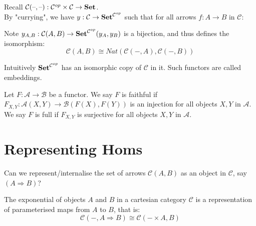 \begin{definition}
Recall $\mathcal{C}(\text{--}, \text{--}): \mathcal{C}^{op} \times \mathcal{C}
 \rightarrow \mathbf {Set}$.\\
By "currying", we have $y: \mathcal{C} \rightarrow \mathbf {Set}^{\mathcal{C}^{op}}$
 such that for all arrows $f: A \rightarrow B$ in $\mathcal{C}$:
\begin{center}
\end{center}

Note $y_{A,B} : \mathcal{C}(A,B) \rightarrow \mathbf {Set}^{\mathcal{C}^{op}}(y_A, y_B)$ 
is a bijection, and thus defines the isomorphism:
\[ \mathcal{C}(A,B)  \cong  Nat( \mathcal{C}(-,A), \mathcal{C}(-,B)) \]

Intuitively $\mathbf {Set}^{\mathcal{C}^{op}}$ has an isomorphic copy of 
$\mathcal{C}$ in it. Such functors are called embeddings.
\end{definition}


\begin{definition}
Let $F : \mathcal{A} \rightarrow \mathcal{B}$ be a functor. We say $F$ is 
faithful if $F_{X,Y} : \mathcal{A}(X,Y) \rightarrow \mathcal{B}(F(X),F(Y))$ 
is an injection for all objects $X,Y$ in $\mathcal{A}$. We say $F$ is full 
if $F_{X,Y}$ is surjective for all objects $X,Y$ in $\mathcal{A}$.
\end{definition}


\section{Representing Homs}

Can we represent/internalise the set of arrows $\mathcal{C}(A,B)$ as an object in 
$\mathcal{C}$, say $(A \Rightarrow B)$?

\begin{definition}[Exponentials]
The exponential of objects $A$ and $B$ in a cartesian category $\mathcal{C}$ 
is a representation of parameterised maps from $A$ to $B$, that is:
\[  \mathcal{C}(-, A \Rightarrow B) \cong \mathcal{C}(-\times A, B)  \]

\end{definition}


